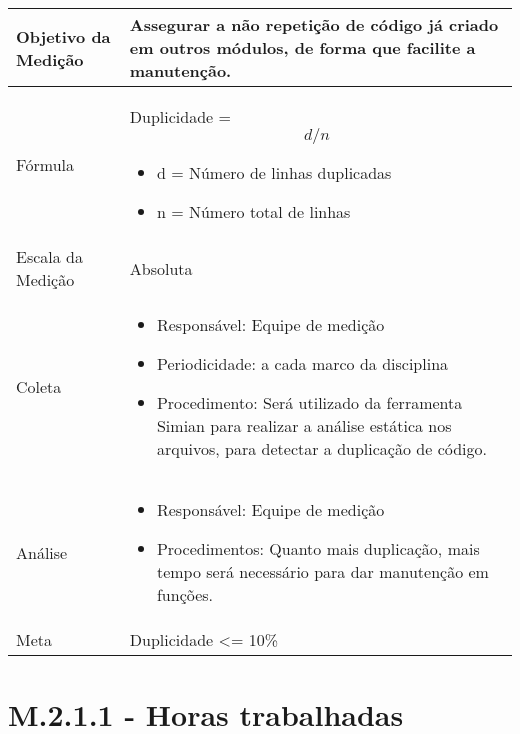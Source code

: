 	\begin{tabular}{ |p{4cm}|p{8cm}|  }
	 \hline
	 Objetivo da Medição 		& 	Assegurar a não repetição de código já criado em outros módulos, de forma que facilite a manutenção.   \\
	 \hline
	 Fórmula		& 	Duplicidade = \[d / n\]	\begin{itemize} \item d = Número de linhas duplicadas \item n = Número total de linhas \end{itemize}\\
	 \hline
	 Escala da Medição 		& Absoluta		 \\
	 \hline
	 Coleta		& 	\begin{itemize} \item Responsável: Equipe de medição \item Periodicidade: a cada marco da disciplina \item Procedimento: Será utilizado da ferramenta Simian para realizar a análise estática nos arquivos, para detectar a duplicação de código.\end{itemize}	\\
	 \hline
	 Análise		& 	\begin{itemize} \item Responsável: Equipe de medição \item Procedimentos: Quanto mais duplicação, mais tempo será necessário para dar manutenção em funções. \end{itemize}	 \\
	 \hline
	 Meta		& 	Duplicidade <= 10\%	 \\
	 \hline
	\end{tabular}

\section{M.2.1.1 - Horas trabalhadas} %

